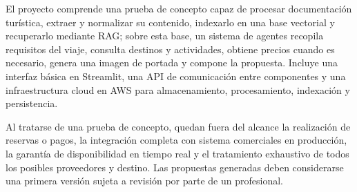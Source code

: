 El proyecto comprende una prueba de concepto capaz de procesar documentación turística, extraer y normalizar su contenido, indexarlo en una base vectorial y recuperarlo mediante RAG; sobre esta base, un sistema de agentes recopila requisitos del viaje, consulta destinos y actividades, obtiene precios cuando es necesario, genera una imagen de portada y compone la propuesta. Incluye una interfaz básica en Streamlit, una API de comunicación entre componentes y una infraestructura cloud en AWS para almacenamiento, procesamiento, indexación y persistencia.

Al tratarse de una prueba de concepto, quedan fuera del alcance la realización de reservas o pagos, la integración completa con sistema comerciales en producción, la garantía de disponibilidad en tiempo real y el tratamiento exhaustivo de todos los posibles proveedores y destino. Las propuestas generadas deben considerarse una primera versión sujeta a revisión por parte de un profesional.
